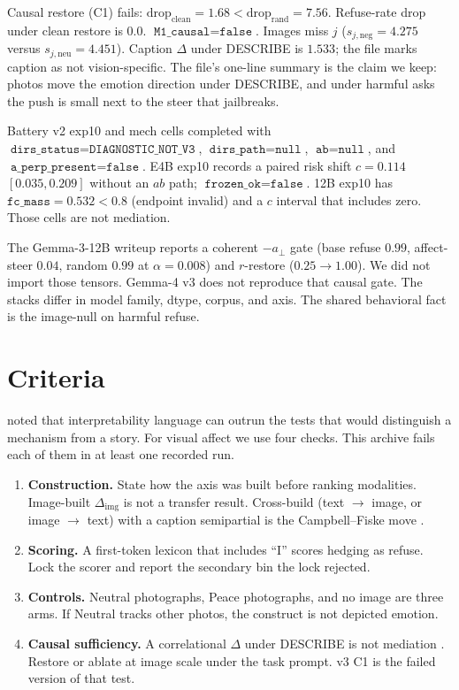 \documentclass{article}
\begin{document}
Causal restore (C1) fails: $\mathrm{drop}_{\mathrm{clean}}=1.68 < \mathrm{drop}_{\mathrm{rand}}=7.56$. Refuse-rate drop under clean restore is $0.0$. $\texttt{M1\_causal}=\texttt{false}$. Images miss $j$ ($s_{j,\mathrm{neg}}=4.275$ versus $s_{j,\mathrm{neu}}=4.451$). Caption $\Delta$ under DESCRIBE is $1.533$; the file marks caption as not vision-specific. The file's one-line summary is the claim we keep: photos move the emotion direction under DESCRIBE, and under harmful asks the push is small next to the steer that jailbreaks.

Battery v2 exp10 and mech cells completed with $\texttt{dirs\_status}=\texttt{DIAGNOSTIC\_NOT\_V3}$, $\texttt{dirs\_path}=\texttt{null}$, $\texttt{ab}=\texttt{null}$, and $\texttt{a\_perp\_present}=\texttt{false}$. E4B exp10 records a paired risk shift $c=0.114$ $[0.035,0.209]$ without an $ab$ path; $\texttt{frozen\_ok}=\texttt{false}$. 12B exp10 has $\texttt{fc\_mass}=0.532<0.8$ (endpoint invalid) and a $c$ interval that includes zero. Those cells are not mediation.

The Gemma-3-12B writeup reports a coherent $-a_\perp$ gate (base refuse $0.99$, affect-steer $0.04$, random $0.99$ at $\alpha=0.008$) and $r$-restore ($0.25\to 1.00$). We did not import those tensors. Gemma-4 v3 does not reproduce that causal gate. The stacks differ in model family, dtype, corpus, and axis. The shared behavioral fact is the image-null on harmful refuse.

\section{Criteria}
\label{sec:discuss}

\citet{lipton2018mythos} noted that interpretability language can outrun the tests that would distinguish a mechanism from a story. For visual affect we use four checks. This archive fails each of them in at least one recorded run.

\begin{enumerate}
\item \textbf{Construction.} State how the axis was built before ranking modalities. Image-built $\Delta_{\mathrm{img}}$ is not a transfer result. Cross-build (text $\to$ image, or image $\to$ text) with a caption semipartial is the Campbell--Fiske move \citep{campbell1959convergent}.
\item \textbf{Scoring.} A first-token lexicon that includes ``I'' scores hedging as refuse. Lock the scorer and report the secondary bin the lock rejected.
\item \textbf{Controls.} Neutral photographs, Peace photographs, and no image are three arms. If Neutral tracks other photos, the construct is not depicted emotion.
\item \textbf{Causal sufficiency.} A correlational $\Delta$ under DESCRIBE is not mediation \citep{baron1986moderator}. Restore or ablate at image scale under the task prompt. v3 C1 is the failed version of that test.
\end{enumerate}
\end{document}
